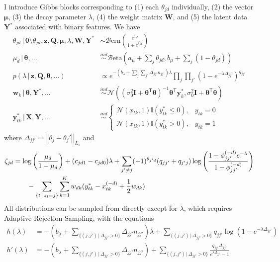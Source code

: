 \documentclass[12pt,letterpaper]{report}
\newcommand{\Norm}[2]{\mathcal{N}(#1,#2)}
\newcommand{\Bern}[1]{\mathcal{B}\mathrm{ern}\left(#1\right)}
\newcommand{\Beta}[2]{\mathcal{B}\mathrm{eta}(#1,#2)}
\newcommand{\given}{\, \vert \,}
\newcommand{\norm}[1]{\left\vert \left \vert #1 \right\vert \right\vert}
\newcommand{\bX}{\mathbf{X}}
\newcommand{\by}{\mathbf{y}}
\newcommand{\bY}{\mathbf{Y}}
\newcommand{\bQ}{\mathbf{Q}}
\newcommand{\bz}{\mathbf{z}}
\newcommand{\bw}{\mathbf{w}}
\newcommand{\bW}{\mathbf{W}}
\newcommand{\btheta}{\boldsymbol{\theta}}
\newcommand{\bmu}{\boldsymbol{\mu}}
\begin{document}
I introduce Gibbs blocks corresponding to (1) each $\theta_{jd}$
individually, (2) the vector $\bmu$, (3) the decay parameter
$\lambda$, (4) the weight matrix $\bW$, and (5) the latent data
$\bY^*$ associated with binary features.  We have
\begin{align}
  \label{eq:101}
  \theta_{jd} \given \btheta \setminus \theta_{jd}, \bz, \bQ, \bmu,
  \lambda, \bW, \bY^* &\sim
  \Bern{\frac{e^{\zeta_{jd}}}{1 + e^{\zeta_{jd}}}} \\
  \mu_d \given \btheta, \dots &\stackrel{ind}{\sim} \Beta{a_\mu + \sum_{j} \theta_{jd}}{b_\mu +
  \sum_{j} (1 - \theta_{jd})} \\
p(\lambda \given \bz, \bQ, \btheta, \dots) &\propto e^{-(b_{\lambda} + \sum_{j}\sum_{j'} \Delta_{jj'} n_{jj'})\lambda} \prod_{j}\prod_{j'}
  (1-e^{-\lambda\Delta_{jj'}})^{q_{jj'}} \\
  \bw_k \given \btheta, \bY^{*}, \dots &\stackrel{ind}{\sim}
  \Norm{(\sigma_0^2 \mathbf{I} + \btheta^{\mathsf{T}}
    \btheta)^{-1}\btheta^{\mathsf{T}}\by^*_k}{\sigma_0^2 \mathbf{I} +
    \btheta^{\mathsf{T}} \btheta} \\
  \by^*_{tk} \given \bX, \bY, \dots &\stackrel{ind}{\sim} \begin{cases}
    \Norm{x_{tk}}{1} \mathbb{I}(y^*_{tk} \leq 0), & y_{tk} = 0 \\
    \Norm{x_{tk}}{1} \mathbb{I}(y^*_{tk} > 0), & y_{tk}= 1
  \end{cases}
\end{align}
where $\Delta_{jj'} = \norm{\theta_j - \theta_j'}_{L_1}$ and
\begin{align}
\zeta_{jd} &= \log\left(\frac{\mu_d}{1 - \mu_d}\right)
  + (c_{jd1} - c_{jd0}) \lambda +
    \sum_{j' \neq j}
  (-1)^{\theta_{j'd}}(q_{jj'} + q_{j'j})\log\left(\frac{1 -
      \phi_{jj'}^{(-d)}e^{-\lambda}}{1-\phi_{jj'}^{(-d)}}\right)
  \notag \\ & \qquad - \sum_{\{t \given z_t = j\}} \sum_{k=1}^K
  w_{dk}(y^*_{tk} - x_{tk}^{(-d)} + \frac{1}{2}w_{dk})
\end{align}
All distributions can be sampled from directly except for $\lambda$, which
requires Adaptive Rejection Sampling, with the equations
\begin{align}
  h(\lambda) &= 
  -(b_{\lambda} + \sum_{\{(j,j') \given \Delta_{jj'} > 0\}} \Delta_{jj'} n_{jj'})\lambda +
  \sum_{\{(j,j') \given \Delta_{jj'} > 0\}} q_{jj'} \log(1 - e^{-\lambda\Delta_{jj'}}) \\
  h'(\lambda) &= -(b_{\lambda} + \sum_{\{(j,j') \given \Delta_{jj'} > 0\}} \Delta_{jj'}
  n_{jj'}) + \sum_{\{(j,j') \given \Delta_{jj'} > 0\}}
  \frac{q_{jj'}\Delta_{jj'}}{e^{\lambda\Delta_{jj'}} - 1}
\end{align}
\end{document}
